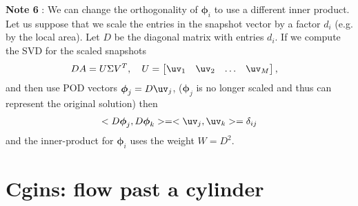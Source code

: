 \documentclass[11pt]{article}
\newcommand{\phiv}{\boldsymbol{\phi}}
\begin{document}
{\bf Note 6} : We can change the orthogonality of $\phiv_i$ to use a different inner product.
Let us suppose that we scale the entries in the snapshot vector by a factor $d_i$ (e.g. by the local area). 
Let $D$ be the diagonal matrix with entries $d_i$. If we compute the SVD for the scaled snapshots
\begin{align}
    D A &= U \Sigma V^T, \quad U = \begin{bmatrix} \uv_1 & \uv_2 & \ldots & \uv_M \end{bmatrix},
\end{align}
and then use POD vectors $\phiv_j = D\uv_j$, ($\phiv_j$ is no longer scaled and thus can represent the
original solution) then
\begin{align}
    <D \phiv_j, D \phiv_k> = <\uv_j,  \uv_k > = \delta_{ij}
\end{align}
and the inner-product for $\phiv_i$ uses the weight $W=D^2$.






\clearpage
\section{Cgins: flow past a cylinder} \label{sec:flowPastACylinder}
\end{document}
